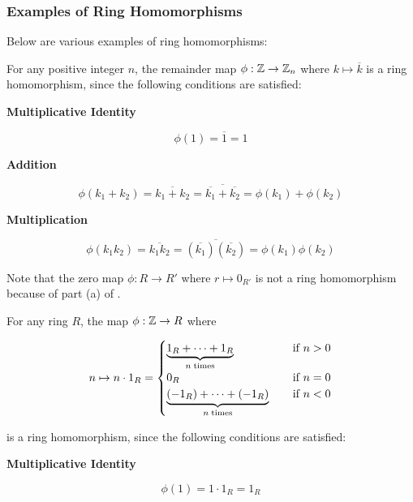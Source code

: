 \documentclass[a4paper,12pt]{article}
\begin{document}
\subsubsection{Examples of Ring Homomorphisms}
\begin{exm}
  Below are various examples of ring homomorphisms:

  \begin{alist}
    \item For any positive integer $n$, the remainder map $\phi:\mathbb{Z}\to\mathbb{Z}_{n}$ where $k\mapsto\overline{k}$ is a ring homomorphism, since the following conditions are satisfied:

    \begin{rlist}
      \item \textbf{Multiplicative Identity}

      $$\phi(1)=\overline{1}=1$$

      \item \textbf{Addition}

      $$\phi(k_{1}+k_{2})=\overline{k_{1}+k_{2}}=\overline{\overline{k_{1}}+\overline{k_{2}}}=\phi(k_{1})+\phi(k_{2})$$

      \item \textbf{Multiplication}

      $$\phi(k_{1}k_{2})=\overline{k_{1}k_{2}}=\overline{(\overline{k_{1}})(\overline{k_{2}})}=\phi(k_{1})\phi(k_{2})$$
    \end{rlist}

    Note that the zero map $\phi:R\to R'$ where $r\mapsto 0_{R'}$ is not a ring homomorphism because of part (a) of \rdft[\sctr{3}].

    \item For any ring $R$, the map $\phi:\mathbb{Z}\to R$ where

    $$n\mapsto n\cdot 1_{R}=\begin{cases}
      \underset{n\;\text{times}}{\underbrace{1_{R}+\cdots+1_{R}}}&\;\;\;\;\text{if }n>0\\
      0_{R}&\;\;\;\;\text{if }n=0\\
      \underset{n\;\text{times}}{\underbrace{(-1_{R})+\cdots+(-1_{R})}}&\;\;\;\;\text{if }n<0
    \end{cases}$$\s

    is a ring homomorphism, since the following conditions are satisfied:

    \begin{rlist}
      \item \textbf{Multiplicative Identity}

      $$\phi(1)=1\cdot 1_{R}=1_{R}$$


\end{rlist}
\end{alist}
\end{exm}
\end{document}
